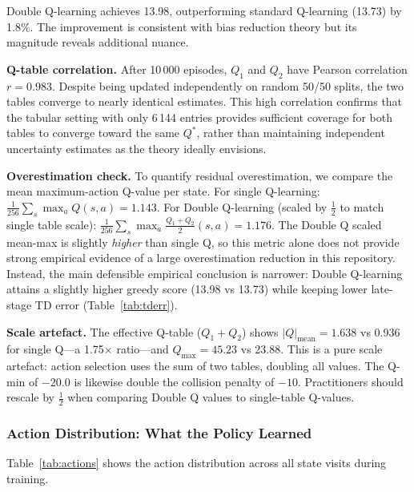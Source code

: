 \documentclass[10pt,conference]{IEEEtran}
\begin{document}
Double Q-learning achieves 13.98, outperforming standard Q-learning
(13.73) by 1.8\%.
The improvement is consistent with bias reduction theory but its
magnitude reveals additional nuance.

\textbf{Q-table correlation.}
After 10\,000 episodes, $Q_1$ and $Q_2$ have Pearson correlation
$r=0.983$.
Despite being updated independently on random 50/50 splits, the two
tables converge to nearly identical estimates.
This high correlation confirms that the tabular setting with only
6\,144 entries provides sufficient coverage for both tables to
converge toward the same $Q^*$, rather than maintaining independent
uncertainty estimates as the theory ideally envisions.

\textbf{Overestimation check.}
To quantify residual overestimation, we compare the mean
maximum-action Q-value per state.
For single Q-learning: $\frac{1}{256}\sum_s\max_a Q(s,a)=1.143$.
For Double Q-learning (scaled by $\tfrac{1}{2}$ to match single
table scale): $\frac{1}{256}\sum_s\max_a\frac{Q_1+Q_2}{2}(s,a)=1.176$.
The Double Q scaled mean-max is slightly \emph{higher} than single Q,
so this metric alone does not provide strong empirical evidence of a
large overestimation reduction in this repository.
Instead, the main defensible empirical conclusion is narrower:
Double Q-learning attains a slightly higher greedy score
(13.98 vs 13.73) while keeping lower late-stage TD error
(Table~\ref{tab:tderr}).

\textbf{Scale artefact.}
The effective Q-table ($Q_1+Q_2$) shows $|Q|_{\text{mean}}=1.638$
vs 0.936 for single Q---a 1.75$\times$ ratio---and
$Q_{\max}=45.23$ vs 23.88.
This is a pure scale artefact: action selection uses the sum of two
tables, doubling all values.
The Q-min of $-20.0$ is likewise double the collision penalty of
$-10$.
Practitioners should rescale by $\tfrac{1}{2}$ when comparing
Double Q values to single-table Q-values.

\subsubsection{Action Distribution: What the Policy Learned}

Table~\ref{tab:actions} shows the action distribution across all
state visits during training.
\end{document}
